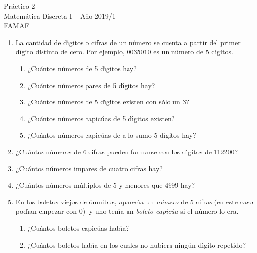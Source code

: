 \documentclass[12pt,spanish,makeidx]{amsbook}
\begin{document}
{\bf \begin{center} Práctico 2 \\ Matemática Discreta I -- Año 2019/1 \\ FAMAF \end{center}}

\smallskip

\begin {enumerate}


\item La cantidad de d\'\i gitos o cifras de un n\'umero se cuenta a partir del primer d\'\i gito distinto de cero. Por ejemplo, $0035010$ es un n\'umero de $5$ d\'\i gitos.
\begin{enumerate}
\item ¿Cu\'antos n\'umeros de 5 d\'\i gitos hay?
\item ¿Cu\'antos n\'umeros pares de 5 d\'\i gitos  hay?
\item ¿Cu\'antos n\'umeros de 5 d\'\i gitos existen con s\'olo un 3?
\item ¿Cu\'antos n\'umeros capic\'uas de 5 d\'\i gitos existen?
\item ¿Cu\'antos n\'umeros capic\'uas de a lo sumo 5 d\'\i gitos hay?
\end{enumerate}

\smallskip

\item ¿Cu\'antos n\'umeros de 6 cifras pueden formarse con los d\'\i gitos de 112200?

\smallskip

\item ¿Cu\'antos n\'umeros impares de cuatro cifras hay?

\smallskip

\item ¿Cu\'antos n\'umeros m\'ultiplos de  5 y menores que 4999 hay?

\smallskip

\item En los boletos viejos de \'omnibus, aparec\'\i a un {\em n\'umero} de 5 cifras (en este caso pod\'\i an empezar con 0), y uno ten\'\i a un {\it boleto capic\'ua} si el n\'umero lo era.
\begin{enumerate}
\item ¿Cu\'antos boletos capic\'uas hab\'\i a?
\item ¿Cu\'antos boletos hab\'\i a en los cuales no hubiera ning\'un d\'\i gito repetido?
\end{enumerate}


\end{enumerate}
\end{document}

